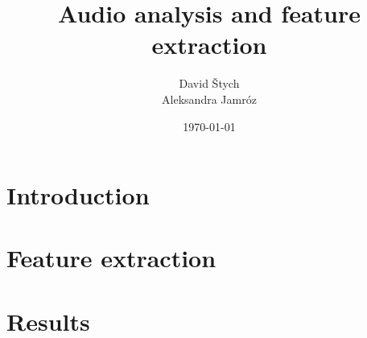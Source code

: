 \documentclass{article}
\title{Audio analysis and feature extraction}
\author{David Štych\\ Aleksandra Jamróz}
\date{\today{}}
\begin{document}
\maketitle

\section*{Introduction}


\section*{Feature extraction}


\section*{Results}
\end{document}
